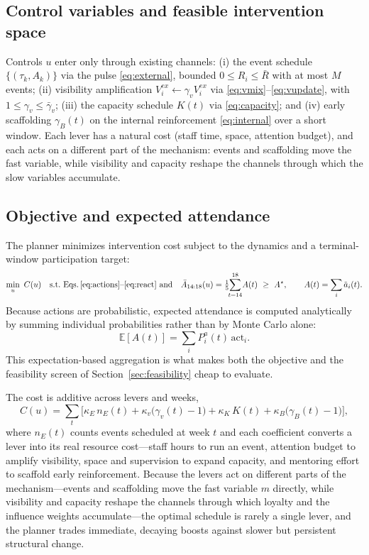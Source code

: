 \documentclass[11pt]{article}
\begin{document}
\subsection{Control variables and feasible intervention space}
Controls $u$ enter only through existing channels: (i) the event schedule $\{(\tau_k,A_k)\}$ via the pulse \eqref{eq:external}, bounded $0\le R_i\le\bar R$ with at most $M$ events; (ii) visibility amplification $V^{ex}_i\leftarrow\gamma_v V^{ex}_i$ via \eqref{eq:vmix}--\eqref{eq:vupdate}, with $1\le\gamma_v\le\bar\gamma_v$; (iii) the capacity schedule $K(t)$ via \eqref{eq:capacity}; and (iv) early scaffolding $\gamma_B(t)$ on the internal reinforcement \eqref{eq:internal} over a short window. Each lever has a natural cost (staff time, space, attention budget), and each acts on a different part of the mechanism: events and scaffolding move the fast variable, while visibility and capacity reshape the channels through which the slow variables accumulate.

\subsection{Objective and expected attendance}
The planner minimizes intervention cost subject to the dynamics and a terminal-window participation target:
\begin{equation*}
\min_{u}\ C(u)\quad\text{s.t.\ Eqs.\,\eqref{eq:actions}--\eqref{eq:react} and}\quad
\bar A_{14:18}(u)=\tfrac15\!\!\sum_{t=14}^{18}\!A(t)\ \ge\ A^\star,\qquad A(t)=\sum_i\tilde a_i(t).
\end{equation*}
Because actions are probabilistic, expected attendance is computed analytically by summing individual probabilities rather than by Monte Carlo alone:
\begin{equation*}
\mathbb{E}[A(t)]=\sum_i P^a_i(t)\,\mathrm{act}_i.
\end{equation*}
This expectation-based aggregation is what makes both the objective and the feasibility screen of Section~\ref{sec:feasibility} cheap to evaluate.

The cost is additive across levers and weeks,
\begin{equation*}
C(u)=\sum_t\Big[\kappa_E\,n_E(t)+\kappa_v\big(\gamma_v(t)-1\big)+\kappa_K\,K(t)+\kappa_B\big(\gamma_B(t)-1\big)\Big],
\end{equation*}
where $n_E(t)$ counts events scheduled at week $t$ and each coefficient converts a lever into its real resource cost---staff hours to run an event, attention budget to amplify visibility, space and supervision to expand capacity, and mentoring effort to scaffold early reinforcement. Because the levers act on different parts of the mechanism---events and scaffolding move the fast variable $m$ directly, while visibility and capacity reshape the channels through which loyalty and the influence weights accumulate---the optimal schedule is rarely a single lever, and the planner trades immediate, decaying boosts against slower but persistent structural change.
\end{document}
